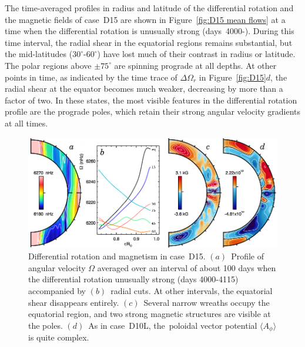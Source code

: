 The time-averaged profiles in radius and latitude of the differential
rotation and the magnetic fields of case~D15 are shown in Figure~\ref{fig:D15
mean flows} at a time when the differential rotation is unusually strong
(days~4000\medspace-).  During this time interval, the radial shear in the
equatorial regions remains substantial, but the mid-latitudes
($30^\circ$-$60^\circ$) have lost much of their contrast in radius or
latitude.  The polar regions above $\pm75^\circ$ are spinning prograde at all depths.
At other points in time, as indicated by the time trace of
$\Delta \Omega_r$ in Figure~\ref{fig:D15}$d$, the radial shear at the
equator becomes much weaker, decreasing by more than a factor of two.
In these states, the most visible features in the differential
rotation profile are the prograde poles, which retain their strong
angular velocity gradients at all times.

\begin{figure}[!t]
  \begin{center}
    \includegraphics{figs/chapter_8/mmc_vturf_15_mean_flows.eps}
  \end{center}
  \caption[Differential rotation and magnetism in case~D15]
          {Differential rotation and magnetism in case~D15.
          $(a)$~Profile of angular velocity $\Omega$ averaged over an
          interval of about 100 days when the differential rotation
          unusually strong (days 4000-4115) accompanied by $(b)$~radial
          cuts.  At other intervals, the equatorial shear disappears
          entirely.  $(c)$~Several narrow wreaths occupy the
          equatorial region, and two strong magnetic structures are
          visible at the poles. $(d)$~As in case~D10L, the~poloidal
          vector potential $\langle A_\phi \rangle$ is quite complex.
          \label{fig:D15 mean flows}}
\end{figure}



